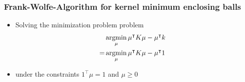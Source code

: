 \documentclass[10pt,aspectratio=169,handout]{beamer}
\begin{document}
\begin{frame}
    \frametitle{Frank-Wolfe-Algorithm for kernel minimum enclosing balls}

    \begin{minipage}{0.49\textwidth}
        \begin{itemize}
            \item Solving the minimization problem problem
            \[\begin{aligned}
                &\operatorname*{argmin}_{\mu} \mu^\intercal K \mu-\mu^\intercal k\\=&\operatorname*{argmin}_{\mu} \mu^\intercal K \mu-\mu^\intercal 1
            \end{aligned}\]
            \item under the constraints $1^\intercal\mu=1$ and $\mu\geq 0$
        \end{itemize}
    \end{minipage}
    \begin{minipage}{0.49\textwidth}
        \inputminted[bgcolor=LightGray,fontsize=\small]{python}{code/frank_wolfe2.py}
    \end{minipage}

\end{frame}
\end{document}

